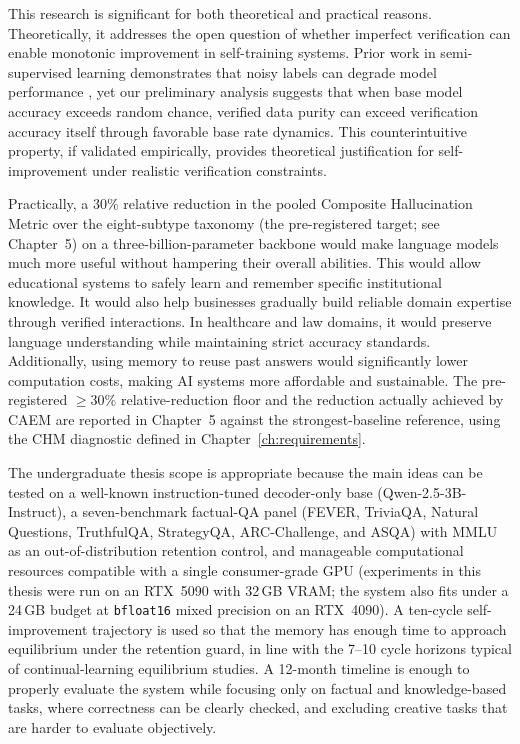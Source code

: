 This research is significant for both theoretical and practical reasons. Theoretically, it addresses the open question of whether imperfect verification can enable monotonic improvement in self-training systems. Prior work in semi-supervised learning demonstrates that noisy labels can degrade model performance \cite{natarajan2013learning}, yet our preliminary analysis suggests that when base model accuracy exceeds random chance, verified data purity can exceed verification accuracy itself through favorable base rate dynamics. This counterintuitive property, if validated empirically, provides theoretical justification for self-improvement under realistic verification constraints.

Practically, a $30\%$ relative reduction in the pooled Composite Hallucination Metric over the eight-subtype taxonomy (the pre-registered target; see Chapter~5) on a three-billion-parameter backbone would make language models much more useful without hampering their overall abilities. This would allow educational systems to safely learn and remember specific institutional knowledge. It would also help businesses gradually build reliable domain expertise through verified interactions. In healthcare and law domains, it would preserve language understanding while maintaining strict accuracy standards. Additionally, using memory to reuse past answers would significantly lower computation costs, making AI systems more affordable and sustainable. The pre-registered $\geq 30\%$ relative-reduction floor and the reduction actually achieved by CAEM are reported in Chapter~5 against the strongest-baseline reference, using the CHM diagnostic defined in Chapter~\ref{ch:requirements}.

The undergraduate thesis scope is appropriate because the main ideas can be tested on a well-known instruction-tuned decoder-only base (Qwen-2.5-3B-Instruct), a seven-benchmark factual-QA panel (FEVER, TriviaQA, Natural Questions, TruthfulQA, StrategyQA, ARC-Challenge, and ASQA) with MMLU as an out-of-distribution retention control, and manageable computational resources compatible with a single consumer-grade GPU (experiments in this thesis were run on an RTX~5090 with 32\,GB VRAM; the system also fits under a 24\,GB budget at \texttt{bfloat16} mixed precision on an RTX~4090). A ten-cycle self-improvement trajectory is used so that the memory has enough time to approach equilibrium under the retention guard, in line with the 7--10 cycle horizons typical of continual-learning equilibrium studies. A 12-month timeline is enough to properly evaluate the system while focusing only on factual and knowledge-based tasks, where correctness can be clearly checked, and excluding creative tasks that are harder to evaluate objectively.

